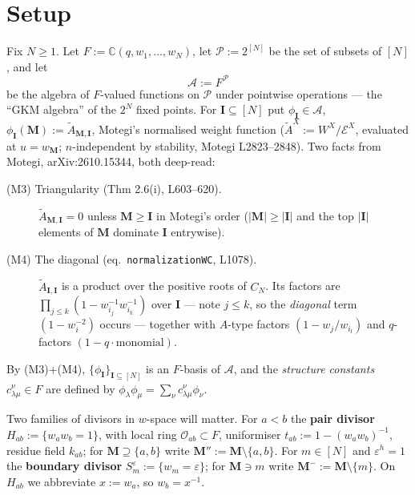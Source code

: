 \documentclass[11pt]{article}
\theoremstyle{plain}
\theoremstyle{definition}
\theoremstyle{remark}
\theoremstyle{plain}
\newcommand{\bI}{\mathbf{I}}
\newcommand{\bM}{\mathbf{M}}
\newcommand{\At}{\widetilde{A}}
\newcommand{\sm}{\setminus}
\begin{document}
\section{Setup}

Fix $N\ge1$.  Let $F:=\mathbb{C}(q,w_1,\dots,w_N)$, let
$\mathcal{P}:=2^{[N]}$ be the set of subsets of $[N]$, and let
\[
  \mathcal{A}:=F^{\mathcal{P}}
\]
be the algebra of $F$-valued functions on $\mathcal{P}$ under pointwise
operations --- the ``GKM algebra'' of the $2^N$ fixed points.  For
$\bI\subseteq[N]$ put $\phi_{\bI}\in\mathcal{A}$,
$\phi_{\bI}(\bM):=\At_{\bM,\bI}$, Motegi's normalised weight function
($\At^X:=W^X/\mathcal{E}^X$, evaluated at $u=w_{\bM}$; $n$-independent by
stability, Motegi L2823--2848).  Two facts from Motegi, arXiv:2610.15344, both
deep-read:

\begin{description}
\item[(M3) Triangularity (Thm 2.6(i), L603--620).]
  $\At_{\bM,\bI}=0$ unless $\bM\ge\bI$ in Motegi's order ($|\bM|\ge|\bI|$ and the
  top $|\bI|$ elements of $\bM$ dominate $\bI$ entrywise).
\item[(M4) The diagonal (eq.\ \texttt{normalizationWC}, L1078).]
  $\At_{\bI,\bI}$ is a product over the positive roots of $C_N$.  Its factors are
  $\prod_{j\le k}(1-w_{i_j}^{-1}w_{i_k}^{-1})$ over $\bI$ --- note $j\le k$, so
  the \emph{diagonal} term $(1-w_{i}^{-2})$ occurs --- together with $A$-type
  factors $(1-w_j/w_{i_l})$ and $q$-factors $(1-q\cdot\text{monomial})$.
\end{description}

By (M3)+(M4), $\{\phi_{\bI}\}_{\bI\subseteq[N]}$ is an $F$-basis of
$\mathcal{A}$, and the \emph{structure constants} $c^{\nu}_{\lambda\mu}\in F$ are
defined by $\phi_\lambda\phi_\mu=\sum_\nu c^{\nu}_{\lambda\mu}\phi_\nu$.

Two families of divisors in $w$-space will matter.  For $a<b$ the
\textbf{pair divisor} $H_{ab}:=\{w_aw_b=1\}$, with local ring
$\mathcal{O}_{ab}\subset F$, uniformiser $t_{ab}:=1-(w_aw_b)^{-1}$, residue field
$k_{ab}$; for $\bM\supseteq\{a,b\}$ write $\bM'':=\bM\sm\{a,b\}$.  For $m\in[N]$
and $\varepsilon^{h}=1$ the \textbf{boundary divisor}
$S_m^{\varepsilon}:=\{w_m=\varepsilon\}$; for $\bM\ni m$ write
$\bM^{-}:=\bM\sm\{m\}$.  On $H_{ab}$ we abbreviate $x:=w_a$, so $w_b=x^{-1}$.
\end{document}

